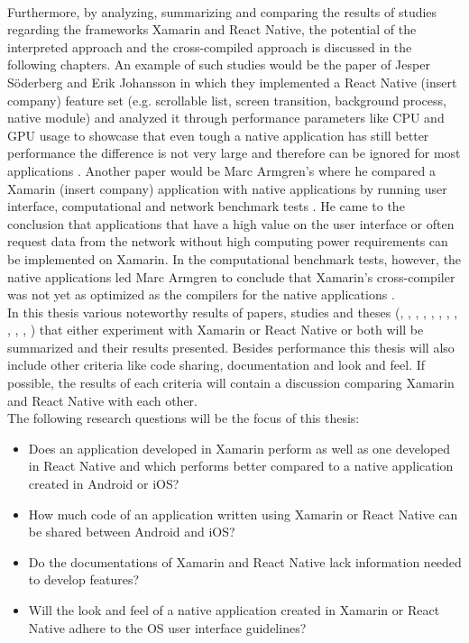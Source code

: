 \documentclass[Bachelor,BIF,english]{twbook}
\begin{document}
\\[\baselineskip]
Furthermore, by analyzing, summarizing and comparing the results of studies regarding the frameworks Xamarin and React Native, the potential of the interpreted approach and the cross-compiled approach is discussed in the following chapters. An example of such studies would be the paper of Jesper Söderberg and Erik Johansson in which they implemented a React Native (insert company) feature set (e.g. scrollable list, screen transition, background process, native module) and analyzed it through performance parameters like CPU and GPU usage to showcase that even tough a native application has still better performance the difference is not very large and therefore can be ignored for most applications \cite{JohanssonSderberg2018}. Another paper would be Marc Armgren's where he compared a Xamarin (insert company) application with native applications by running user interface, computational and network benchmark tests \cite{Armgren_2015}. He came to the conclusion that applications that have a high value on the user interface or often request data from the network without high computing power requirements can be implemented on Xamarin. In the computational benchmark tests, however, the native applications led Marc Armgren to conclude that Xamarin's cross-compiler was not yet as optimized as the compilers for the native applications \cite{Armgren_2015}.
\\[\baselineskip]
In this thesis various noteworthy results of papers, studies and theses (\cite{Danielsson_2016}, \cite{Axelsson2016}, \cite{Hansson_Vidhall_2016}, \cite{MartinezLecomte2018}, \cite{ZubaBernhard2017EdPb}, \cite{WillocxVossaertNaessens2015}, \cite{MartinezLecomte2017}, \cite{Dickson_2013}, \cite{GaouarBenamarBendimerad2016}, \cite{7479278}, \cite{LinckArne2016}, \cite{7934674}) that either experiment with Xamarin or React Native or both will be summarized and their results presented. Besides performance this thesis will also include other criteria like code sharing, documentation and look and feel. If possible, the results of each criteria will contain a discussion comparing Xamarin and React Native with each other. 
\\[\baselineskip]
The following research questions will be the focus of this thesis:
\begin{itemize}
\item Does an application developed in Xamarin perform as well as one developed in React Native and which performs better compared to a native application created in Android or iOS?
\item How much code of an application written using Xamarin or React Native can be shared between Android and iOS?
\item Do the documentations of Xamarin and React Native lack information needed to develop features?
\item Will the look and feel of a native application created in Xamarin or React Native adhere to the OS user interface guidelines?
\end{itemize}
\end{document}
